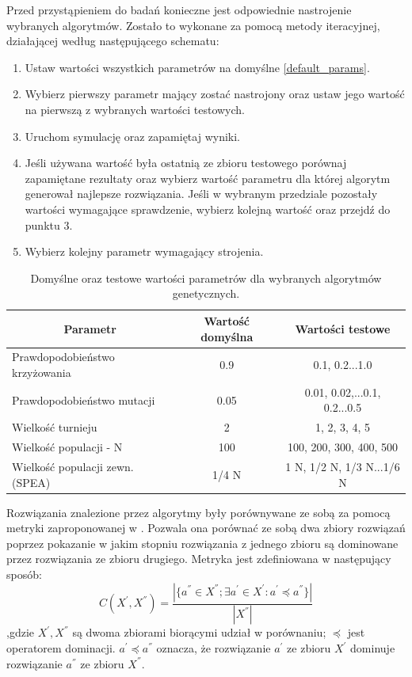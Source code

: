 \documentclass[twoside]{iisthesis}
\begin{document}
Przed przystąpieniem do badań konieczne jest odpowiednie nastrojenie wybranych algorytmów. Zostało to wykonane za pomocą metody iteracyjnej, działającej według następującego schematu:\\
\begin{enumerate}
	\item Ustaw wartości wszystkich parametrów na domyślne \eqref{default_params}.
	\item Wybierz pierwszy parametr mający zostać nastrojony oraz ustaw jego wartość na pierwszą z wybranych wartości testowych.
	\item Uruchom symulację oraz zapamiętaj wyniki.
	\item Jeśli używana wartość była ostatnią ze zbioru testowego porównaj zapamiętane rezultaty oraz wybierz wartość parametru dla której algorytm generował najlepsze rozwiązania. Jeśli w wybranym przedziale pozostały wartości wymagające sprawdzenie, wybierz kolejną wartość oraz przejdź do punktu 3.
	\item Wybierz kolejny parametr wymagający strojenia.\\
\end{enumerate}
\begin{table}[H]
\centering
\begin{tabular}{|l|c|c|}
\hline
\multicolumn{1}{|c|}{\textbf{Parametr}} & \textbf{Wartość domyślna} & \textbf{Wartości testowe}                    \\ \hline
Prawdopodobieństwo krzyżowania          & 0.9                       & 0.1, 0.2...1.0                             \\ \hline
Prawdopodobieństwo mutacji              & 0.05                      & 0.01, 0.02,...0.1, 0.2...0.5 \\ \hline
Wielkość turnieju                       & 2                         & 1, 2, 3, 4, 5                                    \\ \hline
Wielkość populacji - N                  & 100                       & 100, 200, 300, 400, 500                      \\ \hline
Wielkość populacji zewn. (SPEA)         & 1/4 N                     & 1 N, 1/2 N, 1/3 N...1/6 N                  \\ \hline
\end{tabular}
\caption{Domyślne oraz testowe wartości parametrów dla wybranych algorytmów genetycznych.}
\label{default_params}
\end{table}
Rozwiązania znalezione przez algorytmy były porównywane ze sobą za pomocą metryki zaproponowanej w \cite{tuning}. Pozwala ona porównać ze sobą dwa zbiory rozwiązań poprzez pokazanie w jakim stopniu rozwiązania z jednego zbioru są dominowane przez rozwiązania ze zbioru drugiego. Metryka jest zdefiniowana w następujący sposób:
\begin{equation}
	C(X^{'}, X^{''}) = \dfrac{|\{a^{''} \in X^{''}; \exists a^{'} \in X^{'}: a^{'} \preceq a^{''}\}|}{|X^{''}|}
\end{equation}
,gdzie $X^{'}, X^{''}$ są dwoma zbiorami biorącymi udział w porównaniu; $\preceq$ jest operatorem dominacji. $a^{'} \preceq a^{''}$ oznacza, że rozwiązanie $a^{'}$ ze zbioru $X^{'}$ dominuje rozwiązanie $a^{''}$ ze zbioru $X^{''}$.\\
\end{document}
